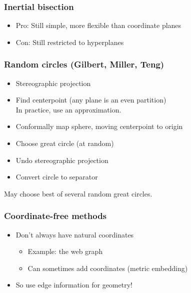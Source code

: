 \documentclass{beamer}
\begin{document}
\begin{frame}
  \frametitle{Inertial bisection}

  \begin{center}
    \begin{tikzpicture}
      
    \end{tikzpicture}
  \end{center}

  \begin{itemize}
  \item Pro: Still simple, more flexible than coordinate planes
  \item Con: Still restricted to hyperplanes
  \end{itemize}
\end{frame}



\begin{frame}
  \frametitle{Random circles (Gilbert, Miller, Teng)}
  
  \begin{itemize}
  \item Stereographic projection
  \item Find centerpoint (any plane is an even partition) \\
    In practice, use an approximation.
  \item Conformally map sphere, moving centerpoint to origin
  \item Choose great circle (at random)
  \item Undo stereographic projection
  \item Convert circle to separator
  \end{itemize}
  May choose best of several random great circles.
\end{frame}


\begin{frame}
  \frametitle{Coordinate-free methods}

  \begin{center}
    \begin{tikzpicture}
      
    \end{tikzpicture}
  \end{center}
  
  \begin{itemize}
  \item Don't always have natural coordinates
    \begin{itemize}
    \item Example: the web graph
    \item Can sometimes add coordinates (metric embedding)
    \end{itemize}
  \item So use edge information for geometry!
  \end{itemize}
\end{frame}
\end{document}
